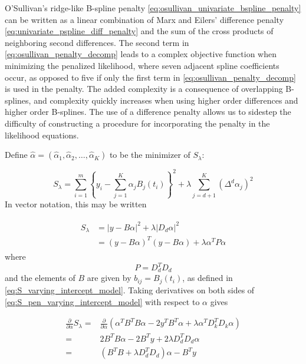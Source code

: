 \documentclass[12pt]{article}
\theoremstyle{definition}
\begin{document}
O'Sullivan's ridge-like B-spline penalty \ref{eq:osullivan_univariate_bspline_penalty} can be written as a linear combination of Marx and Eilers' difference penalty \ref{eq:univariate_pspline_diff_penalty} and the sum of the cross products of neighboring second differences. The second term in \ref{eq:osullivan_penalty_decomp} leads to a complex objective function when minimizing the penalized likelihood, where seven adjacent spline coefficients occur, as opposed to five if only the first term in \ref{eq:osullivan_penalty_decomp} is used in the penalty. The added complexity is a consequence of overlapping B-splines, and complexity quickly increases when using higher order differences and higher order B-splines. The use of a difference penalty allows us to sidestep the difficulty of constructing a procedure for incorporating the penalty in the likelihood equations. 

Define $\hat{\alpha} = \left(\hat{\alpha}_1, \hat{\alpha}_2, \dots, \hat{\alpha}_K \right)$ to be the minimizer of $S_\lambda$:

\begin{equation*}  
S_\lambda = \sum_{i=1}^m \left\{ y_i - \sum_{j=1}^K \alpha_j B_j\left(t_i\right) \right\}^2 + \lambda \sum_{j=d+1}^K \left( \Delta^d\alpha_j \right)^2
\end{equation*}
\noindent
In vector notation, this may be written

\begin{align}
\begin{split}
S_\lambda &= \vert y- B\alpha  \vert^2  + \lambda \vert D_d \alpha\vert^2 \\
&=  \left( y- B\alpha  \right)^T \left( y-B \alpha\right) + \lambda \alpha^T P \alpha
\end{split} \label{eq:S_pen_varying_intercept_model}
\end{align}
\noindent
where 
\[
P = D_d^T D_d
\]
\noindent
and the elements of $B$ are given by $b_{ij} = B_j\left(t_i\right)$, as defined in \ref{eq:S_varying_intercept_model}. Taking derivatives on both sides of \ref{eq:S_pen_varying_intercept_model} with respect to $\alpha$ gives

\begin{align}
\frac{\partial}{\partial \alpha}S_\lambda ={} & \frac{\partial}{\partial \alpha}\left(\alpha^TB^TB \alpha -2y^T B^T\alpha+\lambda \alpha^T D_k^T D_k \alpha  \right) \nonumber \\
= {} & 2B^TB \alpha - 2B^T y + 2\lambda D_d^TD_d\alpha \nonumber\\
= {} & \left(B^T B +  \lambda D_d^TD_d\right)\alpha - B^T y \label{eq:dSlambda_dAlpha}
\end{align} 
\noindent
\end{document}
